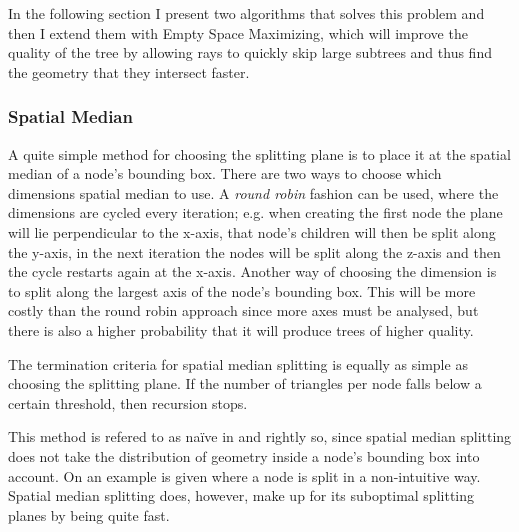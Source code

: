 
In the following section I present two algorithms that solves this problem and
then I extend them with Empty Space Maximizing, which will improve the quality
of the tree by allowing rays to quickly skip large subtrees and thus find the
geometry that they intersect faster.


\subsubsection{Spatial Median}



A quite simple method for choosing the splitting plane is to place it at the
spatial median of a node's bounding box. There are two ways to choose which
dimensions spatial median to use. A \textit{round robin} fashion can be used,
where the dimensions are cycled every iteration; e.g. when creating the first
node the plane will lie perpendicular to the x-axis, that node's children will
then be split along the y-axis, in the next iteration the nodes will be split
along the z-axis and then the cycle restarts again at the x-axis. Another way of
choosing the dimension is to split along the largest axis of the node's bounding
box. This will be more costly than the round robin approach since more axes must
be analysed, but there is also a higher probability that it will produce trees
of higher quality.

The termination criteria for spatial median splitting is equally as simple as
choosing the splitting plane. If the number of triangles per node falls below a
certain threshold, then recursion stops.


This method is refered to as naïve in  and rightly so,
since spatial median splitting does not take the distribution of geometry inside
a node's bounding box into account. On  an example is
given where a node is split in a non-intuitive way. Spatial median splitting
does, however, make up for its suboptimal splitting planes by being quite fast.


